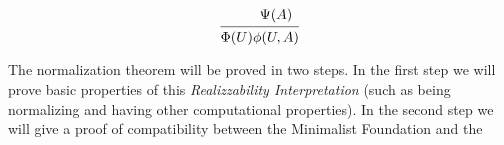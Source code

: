 \begin{dede}
	\begin{gather}
	\begin{prooftree}
	\Hypo{\phantom{\Psi(A)}}
	\Infer1{\Phi(U)}
	\end{prooftree}
	\begin{prooftree}
	\Hypo{\Psi(A)}
	\Infer1{\phi(U,A)}
	\end{prooftree}	
	\end{gather}	
	
	\end{dede}
	
	The normalization theorem will be proved in two steps. In the first step we will prove basic properties of this \emph{Realizzability Interpretation} (such as being normalizing and having other computational properties). In the second step we will give a proof of compatibility between the Minimalist Foundation and the 
	
 	


	